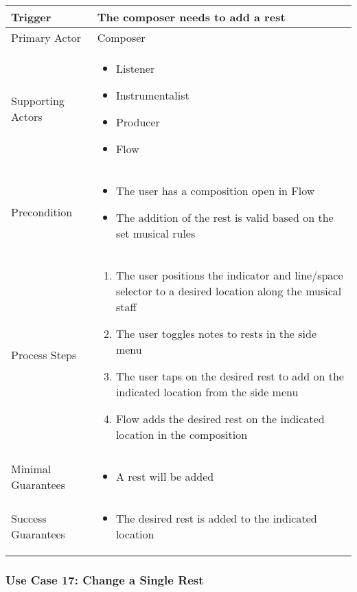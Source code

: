 \begin{tabularx}{\textwidth}{|X|X|}
\hline
Trigger &
The composer needs to add a rest \\
\hline
Primary Actor &
Composer \\
\hline
Supporting Actors & 
\begin{itemize}
\item Listener
\item Instrumentalist
\item Producer
\item Flow
\end{itemize} \\
\hline
Precondition & 
\begin{itemize}
\item The user has a composition open in Flow
\item The addition of the rest is valid based on the set musical rules
\end{itemize} \\
\hline
Process Steps & 
\begin{enumerate}
\item The user positions the indicator and line/space selector to a desired location along the musical staff
\item The user toggles notes to rests in the side menu
\item The user taps on the desired rest to add on the indicated location from the side menu
\item Flow adds the desired rest on the indicated location in the composition
\end{enumerate} \\
\hline
Minimal Guarantees & 
\begin{itemize}
  \item A rest will be added
\end{itemize} \\
\hline
Success Guarantees & 
\begin{itemize}
  \item The desired rest is added to the indicated location
\end{itemize} \\
\hline
\end{tabularx}

\subsubsection{Use Case 17: Change a Single Rest}

